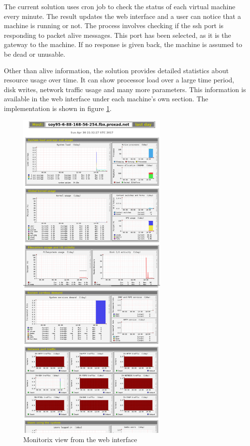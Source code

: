\documentclass{article}
\begin{document}
The current solution uses \gls{cron} job to check the status of each virtual machine every minute. The result updates the web interface and a user can notice that a machine is running or not. The process involves checking if the \gls{ssh} port is responding to packet alive messages. This port has been selected, as it is the gateway to the machine. If no response is given back, the machine is assumed to be dead or unusable.

Other than alive information, the solution provides detailed statistics about resource usage over time. It can show processor load over a large time period, disk writes, network traffic usage and many more parameters. This information is available in the web interface under each machine's own section. The implementation is shown in figure \ref{fig:healthmonitoring-page}.

\begin{figure}[ht]
	\vspace{0.5cm}
	\begin{center}
	\includegraphics[width=7.5cm]{monitorix_screenshot.png}
	\end{center}
	\vspace{0.5cm}
	\caption{Monitorix view from the web interface}
	\label{fig:healthmonitoring-page}
\end{figure}
\end{document}
